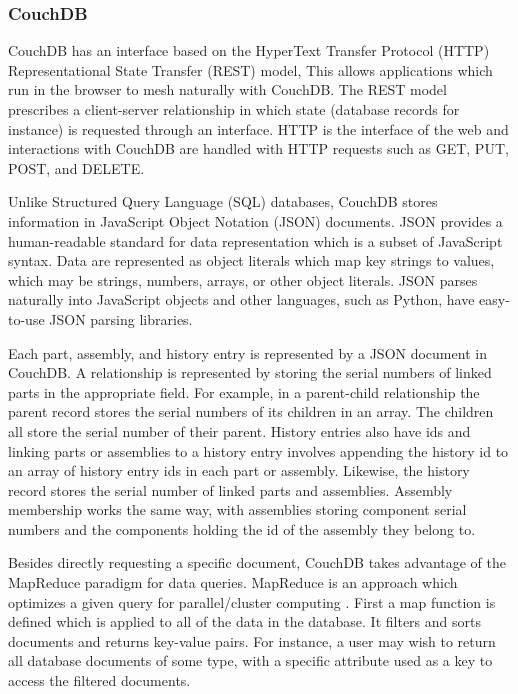 \documentclass[journal]{IEEEtran}
\begin{document}
\subsubsection{CouchDB}
CouchDB has an interface based on the HyperText Transfer Protocol (HTTP) Representational State Transfer (REST) model,
This allows applications which run in the browser to mesh naturally with CouchDB.
The REST model prescribes a client-server
relationship in which state (database records for instance) is requested through an interface.
HTTP is the interface of the web and interactions with CouchDB are handled with HTTP
requests such as GET, PUT, POST, and DELETE. 

Unlike Structured Query Language (SQL) databases, CouchDB stores information in JavaScript Object Notation (JSON) \cite{json}
documents.
JSON provides a human-readable
standard for data representation which is a subset of JavaScript syntax. Data are represented as object
literals which map key strings to values, which may be strings, numbers, arrays, or other object literals. 
JSON parses naturally into JavaScript objects and other languages, such as Python, have easy-to-use
JSON parsing libraries. 

Each part, assembly, and history entry is represented by a JSON document in CouchDB. A relationship
is represented by storing the serial numbers of linked parts in the appropriate field. For example, in a parent-child relationship the parent record stores the serial numbers
of its children in an array. The children all store the serial number of their parent. History entries also have ids and linking
parts or assemblies to a history entry involves appending the history id to an array of history entry ids in each part or assembly. Likewise,
the history record stores the serial number of linked parts and assemblies. Assembly membership works the same way, with assemblies
storing component serial numbers and the components holding the id of the assembly they belong to.

Besides directly requesting a specific document, CouchDB takes advantage of the MapReduce paradigm for data
queries. MapReduce is an approach which optimizes a given query for parallel/cluster computing \cite{mapreduce_dean}. First a map function
is defined which is applied to all of the data in the database. It filters and sorts documents and returns key-value
pairs. For instance, a user may wish to return all database documents of some type, with a specific attribute used as
a key to access the filtered documents. 
\end{document}
